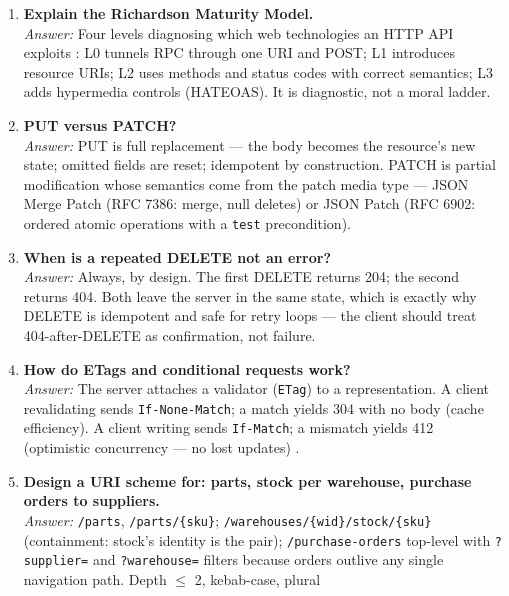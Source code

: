 \begin{enumerate}[label=\textbf{Q\arabic*.}, leftmargin=3.2em, itemsep=0.6em, resume]
  \item \textbf{Explain the Richardson Maturity Model.}\\
        \emph{Answer:} Four levels diagnosing which web technologies an HTTP API
        exploits \cite{richardson2013restful}: L0 tunnels RPC through one URI
        and POST; L1 introduces resource URIs; L2 uses methods and status codes
        with correct semantics; L3 adds hypermedia controls (HATEOAS). It is
        diagnostic, not a moral ladder.
  \item \textbf{PUT versus PATCH?}\\
        \emph{Answer:} PUT is full replacement --- the body becomes the
        resource's new state; omitted fields are reset; idempotent by
        construction. PATCH is partial modification whose semantics come from
        the patch media type --- JSON Merge Patch (RFC 7386: merge, null
        deletes) or JSON Patch (RFC 6902: ordered atomic operations with a
        \texttt{test} precondition).
  \item \textbf{When is a repeated DELETE not an error?}\\
        \emph{Answer:} Always, by design. The first DELETE returns 204; the
        second returns 404. Both leave the server in the same state, which is
        exactly why DELETE is idempotent and safe for retry loops --- the
        client should treat 404-after-DELETE as confirmation, not failure.
  \item \textbf{How do ETags and conditional requests work?}\\
        \emph{Answer:} The server attaches a validator (\texttt{ETag}) to a
        representation. A client revalidating sends \texttt{If-None-Match}; a
        match yields 304 with no body (cache efficiency). A client writing
        sends \texttt{If-Match}; a mismatch yields 412 (optimistic concurrency
        --- no lost updates) \cite{rfc9110}.
  \item \textbf{Design a URI scheme for: parts, stock per warehouse, purchase
        orders to suppliers.}\\
        \emph{Answer:} \texttt{/parts}, \texttt{/parts/\{sku\}};
        \texttt{/warehouses/\{wid\}/stock/\{sku\}} (containment: stock's
        identity is the pair); \texttt{/purchase-orders} top-level with
        \texttt{?supplier=} and \texttt{?warehouse=} filters because orders
        outlive any single navigation path. Depth $\le$ 2, kebab-case, plural

\end{enumerate}

